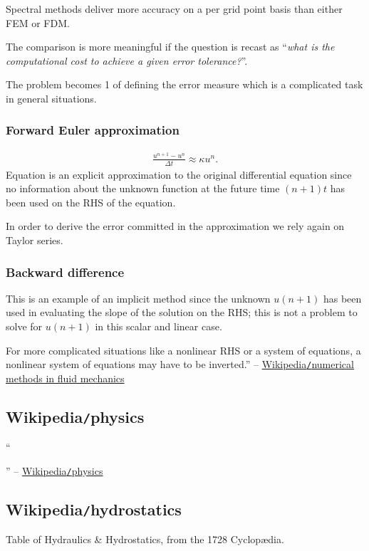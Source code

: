 \documentclass{article}
\begin{document}
Spectral methods deliver more accuracy on a per grid point basis than either FEM or FDM.

The comparison is more meaningful if the question is recast as ``\textit{what is the computational cost to achieve a given error tolerance?}''.

The problem becomes 1 of defining the error measure which is a complicated task in general situations.

\subsubsection{Forward Euler approximation}
\begin{align*}
	\frac{u^{n + 1} - u^n}{\Delta t}\approx\kappa u^n.
\end{align*}
Equation is an explicit approximation to the original differential equation since no information about the unknown function at the future time $(n + 1)t$ has been used on the RHS of the equation.

In order to derive the error committed in the approximation we rely again on Taylor series.

\subsubsection{Backward difference}
This is an example of an implicit method since the unknown $u(n + 1)$ has been used in evaluating the slope of the solution on the RHS; this is not a problem to solve for $u(n + 1)$ in this scalar and linear case.

For more complicated situations like a nonlinear RHS or a system of equations, a nonlinear system of equations may have to be inverted.'' -- \href{https://en.wikipedia.org/wiki/Numerical_methods_in_fluid_mechanics}{Wikipedia{\tt/}numerical methods in fluid mechanics}


\subsection{Wikipedia{\tt/}physics}
``

'' -- \href{https://en.wikipedia.org/wiki/Physics}{Wikipedia{\tt/}physics}


\subsection{Wikipedia{\tt/}hydrostatics}
{\sf Table of Hydraulics \& Hydrostatics, from the 1728 Cyclop\ae dia.}
\end{document}
